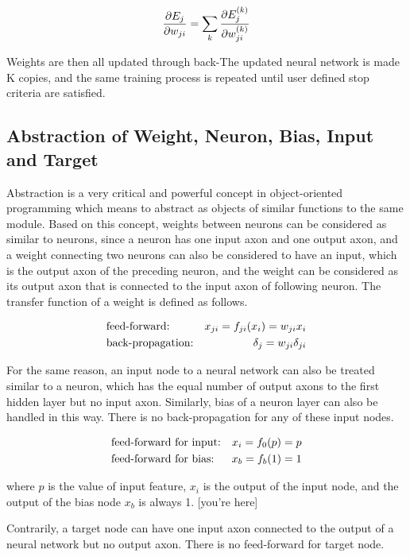 \documentclass[procedia]{easychair}
\begin{document}
\begin{equation}
    \frac{\partial E_j}{\partial w_{ji}} = \sum_k \frac{\partial E_j^{(k)}}{\partial w_{ji}^{(k)}} \notag
\end{equation}

Weights are then all updated through back-The updated neural network is made K copies, and the same training process is repeated until user defined stop criteria are satisfied.

\subsection{Abstraction of Weight, Neuron, Bias, Input and Target}

Abstraction is a very critical and powerful concept in object-oriented programming which means to abstract as objects of similar functions to the same module.  Based on this concept, weights between neurons can be considered as similar to neurons, since a neuron has one input axon and one output axon, and a weight connecting two neurons can also be considered to have an input, which is the output axon of the preceding neuron, and the weight can be considered as its output axon that is connected to the input axon of following neuron.  The transfer function of a weight is defined as follows.

\begin{align}
    & \text{feed-forward:} & x_{ji} = f_{ji}(x_i) = w_{ji}x_i \notag \\
    & \text{back-propagation:} & \delta_j = w_{ji}\delta_{ji} \notag
\end{align}

For the same reason, an input node to a neural network can also be treated similar to a neuron, which has the equal number of output axons to the first hidden layer but no input axon.  Similarly, bias of a neuron layer can also be handled in this way.  There is no back-propagation for any of these input nodes.

\begin{align}
	& \text{feed-forward for input:} & x_i = f_0(p) = p \notag \\
	& \text{feed-forward for bias:} & x_b = f_b(1) = 1 \notag
\end{align}

where $p$ is the value of input feature, $x_i$ is the output of the input node, and the output of the bias node $x_b$ is always 1.  [you're here]

Contrarily, a target node can have one input axon connected to the output of a neural network but no output axon.  There is no feed-forward for target node.
\end{document}
